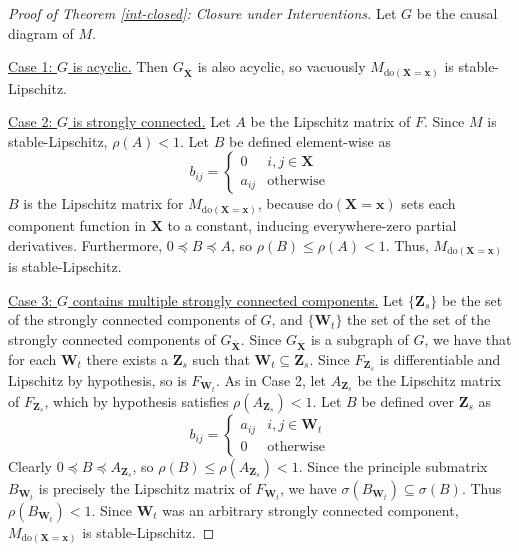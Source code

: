 \documentclass[12pt]{article}
\begin{document}

\begin{proof}[Proof of Theorem \ref{int-closed}: Closure under Interventions]
Let $G$ be the causal diagram of $M$. 

\underline{Case 1: $G$ is acyclic.}
Then $G_{\overline{\mathbf{X}}}$ is also acyclic, so vacuously $M_{\text{do}(\mathbf{X}=\mathbf{x})}$ is stable-Lipschitz.

\underline{Case 2: $G$ is strongly connected.}
Let $A$ be the Lipschitz matrix of $F$. Since $M$ is stable-Lipschitz, $\rho(A)<1$. Let $B$ be defined element-wise as 
\[
b_{ij} = 
\begin{cases}
  0 & i,j\in\mathbf{X} \\
  a_{ij} & \text{otherwise}
\end{cases}
\]
$B$ is the Lipschitz matrix for $M_{\text{do}(\mathbf{X}=\mathbf{x})}$, because $\text{do}(\mathbf{X}=\mathbf{x})$ sets each component function in $\mathbf{X}$ to a constant, inducing everywhere-zero partial derivatives. 
Furthermore, $0\preceq B \preceq A$, so $\rho(B)\leq\rho(A)<1$.
Thus, $M_{\text{do}(\mathbf{X}=\mathbf{x})}$ is stable-Lipschitz.

\underline{Case 3: $G$ contains multiple strongly connected components.}
Let $\{\mathbf{Z}_s\}$ be the set of the strongly connected components of $G$, and $\{\mathbf{W}_t\}$ the set of the set of the strongly connected components of $G_{\overline{\mathbf{X}}}$.
Since $G_{\overline{\mathbf{X}}}$ is a subgraph of $G$, we have that for each $\mathbf{W}_t$ there exists a $\mathbf{Z}_s$ such that $\mathbf{W}_t\subseteq\mathbf{Z}_s$.
Since $F_{\mathbf{Z}_s}$ is differentiable and Lipschitz by hypothesis, so is $F_{\mathbf{W}_t}$.
As in Case 2, let $A_{\mathbf{Z}_s}$ be the Lipschitz matrix of $F_{\mathbf{Z}_s}$, which by hypothesis satisfies $\rho(A_{\mathbf{Z}_s})<1$.
Let $B$ be defined over $\mathbf{Z}_s$ as
\[
b_{ij} = 
\begin{cases}
  a_{ij} & i,j\in\mathbf{W}_t \\
  0 & \text{otherwise}
\end{cases}
\]
Clearly $0\preceq B \preceq A_{\mathbf{Z}_s}$, so $\rho(B)\leq\rho(A_{\mathbf{Z}_s})<1$.
Since the principle submatrix $B_{\mathbf{W}_t}$ is precisely the Lipschitz matrix of $F_{{\mathbf{W}_t}}$, we have $\sigma(B_{\mathbf{W}_t})\subseteq \sigma(B)$. Thus $\rho(B_{\mathbf{W}_t})<1$.
Since $\mathbf{W}_t$ was an arbitrary strongly connected component, $M_{\text{do}(\mathbf{X}=\mathbf{x})}$ is stable-Lipschitz.
\end{proof}
\end{document}
